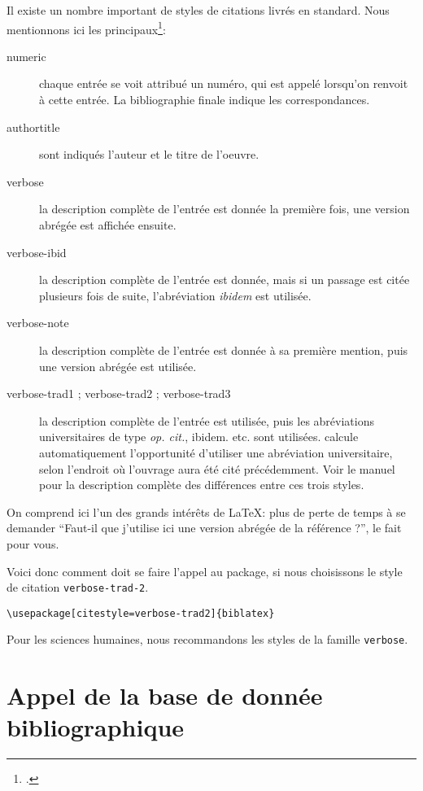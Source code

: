 Il existe un nombre important de styles de citations livrés en standard. Nous mentionnons ici les principaux\footcite[Se reporter pour plus de détails à][]{biblatex_style}:
\begin{description}
\item[numeric]chaque entrée se voit attribué un numéro, qui est appelé lorsqu'on renvoit à cette entrée. La bibliographie finale indique les correspondances.
\item[authortitle]sont indiqués l'auteur et le titre de l'oeuvre.
\item[verbose]la description complète de l'entrée est donnée la première fois, une version abrégée est affichée ensuite.
\item[verbose-ibid]la description complète de l'entrée est donnée, mais si un passage est citée plusieurs fois de suite, l'abréviation \emph{ibidem} est utilisée.
\item[verbose-note]la description complète de l'entrée est donnée à sa première mention, puis une version abrégée est utilisée.
\item[verbose-trad1 ; verbose-trad2 ; verbose-trad3]la description complète de l'entrée est utilisée, puis les abréviations universitaires de type \emph{op. cit.}, {ibidem.} etc. sont utilisées.  calcule automatiquement l'opportunité d'utiliser une abréviation universitaire, selon l'endroit où l'ouvrage aura été cité précédemment. Voir le manuel pour la description complète des différences entre ces trois styles.
\end{description}

On comprend ici l'un des grands intérêts de \LaTeX : plus de perte de temps à se demander \enquote{Faut-il que j'utilise ici une version abrégée de la référence ?},  le fait pour vous.

Voici donc comment doit se faire l'appel au package, si nous choisissons le style de citation \verb|verbose-trad-2|.

\begin{verbatim}
\usepackage[citestyle=verbose-trad2]{biblatex}
\end{verbatim}

Pour les sciences humaines, nous recommandons les styles de la famille \verb|verbose|.


\section{Appel de la base de donnée bibliographique}


